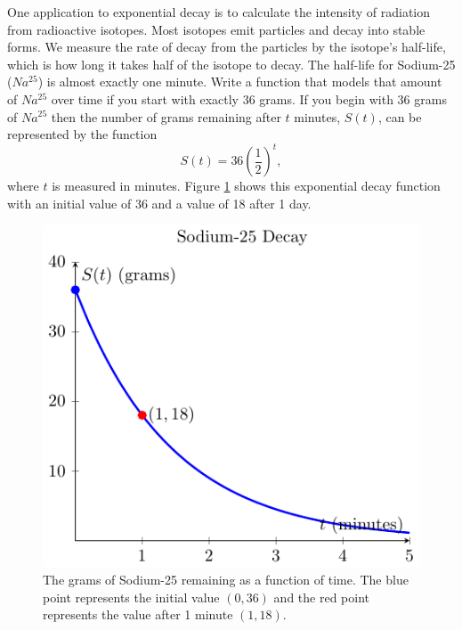 \bex
One application to exponential decay is to calculate the intensity of radiation from
radioactive isotopes.  Most isotopes emit particles and decay into stable forms.  We
measure the rate of decay from the particles by the isotope's half-life, which is
how long it takes half of the isotope to decay.  The half-life for Sodium-25 ($Na^{25}$)
is almost exactly one minute.  Write a function that models that amount of $Na^{25}$ over
time if you start with exactly 36 grams.    
\eex
If you begin with 36 grams of $Na^{25}$ then the number of
grams remaining after $t$ minutes, $S(t)$, can be represented by the function
\[ S(t) = 36 \left( \frac{1}{2} \right)^{t}, \]
where $t$ is measured in minutes. Figure \ref{F:0.2.Ex1} shows this exponential decay
function with an initial value of 36 and a value of 18 after 1 day.
\begin{figure}[ht!]
    \begin{center}
        \includegraphics[width=0.5\columnwidth]{figures/0-2-fig2.pdf}
    \end{center}
    \caption{The grams of Sodium-25 remaining as a function of time. The blue point
    represents the initial value $(0,36)$ and the red point represents the value after 1
minute $(1,18)$.}
    \label{F:0.2.Ex1}
\end{figure}
\afterex

